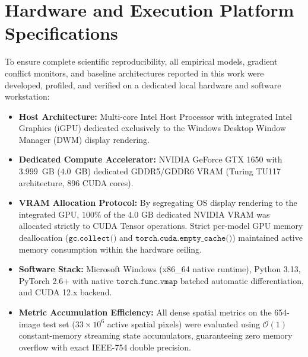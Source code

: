 \documentclass[10pt,journal,compsoc]{IEEEtran}
\begin{document}
\appendices
\section{Hardware and Execution Platform Specifications}
\label{sec:appendix_hardware}
To ensure complete scientific reproducibility, all empirical models, gradient conflict monitors, and baseline architectures reported in this work were developed, profiled, and verified on a dedicated local hardware and software workstation:
\begin{itemize}
    \item \textbf{Host Architecture:} Multi-core Intel Host Processor with integrated Intel Graphics (iGPU) dedicated exclusively to the Windows Desktop Window Manager (DWM) display rendering.
    \item \textbf{Dedicated Compute Accelerator:} NVIDIA GeForce GTX 1650 with $3.999$~GB ($4.0$~GB) dedicated GDDR5/GDDR6 VRAM (Turing TU117 architecture, 896 CUDA cores).
    \item \textbf{VRAM Allocation Protocol:} By segregating OS display rendering to the integrated GPU, $100\%$ of the $4.0\text{ GB}$ dedicated NVIDIA VRAM was allocated strictly to CUDA Tensor operations. Strict per-model GPU memory deallocation ($\texttt{gc.collect()}$ and $\texttt{torch.cuda.empty\_cache()}$) maintained active memory consumption within the hardware ceiling.
    \item \textbf{Software Stack:} Microsoft Windows (x86\_64 native runtime), Python 3.13, PyTorch 2.6+ with native $\texttt{torch.func.vmap}$ batched automatic differentiation, and CUDA 12.x backend.
    \item \textbf{Metric Accumulation Efficiency:} All dense spatial metrics on the 654-image test set ($33\times 10^6$ active spatial pixels) were evaluated using $\mathcal{O}(1)$ constant-memory streaming state accumulators, guaranteeing zero memory overflow with exact IEEE-754 double precision.
\end{itemize}
\end{document}
